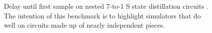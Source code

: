 \documentclass[onecolumn,unpublished]{quantumarticle}
\theoremstyle{definition}
\theoremstyle{definition}
\theoremstyle{definition}
\begin{document}
\begin{figure}
    \centering
    \caption{
        Delay until first sample on nested 7-to-1 S state distillation circuits \cite{fowler2012surfacecodereview}.
        The intention of this benchmark is to highlight simulators that do well on circuits made up of nearly independent pieces.
}
\end{figure}
\end{document}
